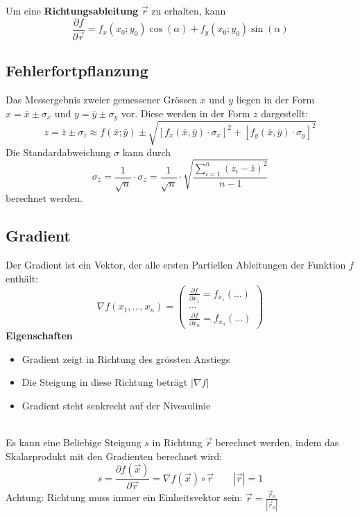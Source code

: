\noindent Um eine \textbf{Richtungsableitung} $\vec{r}$ zu erhalten, kann 
\[
\frac{\partial f}{\partial \vec{r}} = f_x(x_0;y_0)\cos(\alpha) + f_y(x_0;y_0)\sin(\alpha)
\]


\subsection{Fehlerfortpflanzung}
Das Messergebnis zweier gemessener Grössen $x$ und $y$ liegen in der Form $x = \overline{x} \pm \sigma_{\overline{x}}$ und $y = \overline{y} \pm \sigma_{\overline{y}}$ vor. Diese werden in der Form $z$ dargestellt:
\[
z = \overline{z} \pm \sigma_{\overline{z}} \approx f(\overline{x}; \overline{y}) \pm \sqrt{[f_x(\overline{x}, \overline{y})\cdot\sigma_{\overline{x}}]^2 + [f_y(\overline{x}, \overline{y})\cdot\sigma_{\overline{y}}]^2}
\]
Die Standardabweichung $\sigma$ kann durch 
\[
\sigma_{\overline{z}} = \frac{1}{\sqrt{n}}\cdot\sigma_z = \frac{1}{\sqrt{n}}\cdot\sqrt{\frac{\sum\limits_{i=1}^{n}(z_i - \overline{z})^2}{n-1}}
\]
berechnet werden.

\subsection{Gradient}\label{gradient}
Der Gradient ist ein Vektor, der alle ersten Partiellen Ableitungen der Funktion $f$ enthält:
\[
\nabla f(x_1,\dots,x_n) = \begin{pmatrix}
	\frac{\partial f}{\partial x_1} = f_{x_1}(\dots) \\
	\dots \\
	\frac{\partial f}{\partial x_n} = f_{x_n}(\dots)
\end{pmatrix}
\]
\textbf{Eigenschaften}\\
\begin{itemize}[nosep]
	\item Gradient zeigt in Richtung des grössten Anstiegs
	\item Die Steigung in diese Richtung beträgt $\left|\nabla f\right|$
	\item Gradient steht senkrecht auf der Niveaulinie
\end{itemize}~\\

\noindent Es kann eine Beliebige Steigung $s$ in Richtung $\vec{r}$ berechnet werden, indem das Skalarprodukt mit den Gradienten berechnet wird:
\[
s = \frac{\partial f(\vec{x})}{\partial \vec{r}} = \nabla f(\vec{x}) \circ \vec{r} \qquad |\vec{r}| = 1
\]
\noindent Achtung: Richtung muss immer ein Einheitsvektor sein: $\vec{r} = \frac{\vec{r}_0}{\left|\vec{r}_0\right|}$

